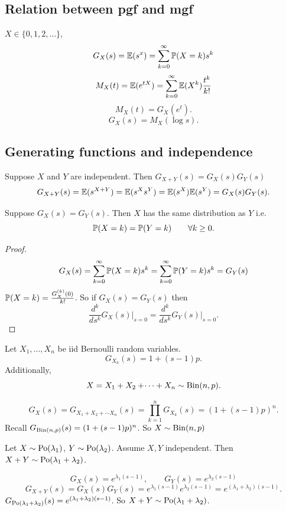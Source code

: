 \documentclass[10pt, a4paper]{article}
\begin{document}
\subsection{Relation between pgf and mgf}
$X \in \{0, 1, 2, \dotsc\}$,
\[
G_X(s) = \E(s ^ x) = \sum_{k = 0}^{\infty}\P(X = k)s ^ k
\]
\[
M_X(t) = \E(e ^ {tX}) = \sum_{k = 0}^{\infty}\E(X ^ k)\frac{t ^ k}{k!}
\]
\[
M_X(t) = G_X(e ^ t).
\]
\[
G_X(s) = M_X(\log{s}).
\]

\subsection{Generating functions and independence}
Suppose $X$ and $Y$ are independent.
Then $G_{X + Y}(s) = G_X(s)G_{Y}(s)$
\[
G_{X + Y}(s) = \E(s ^ {X + Y}) = \E(s ^ Xs ^ Y) = \E(s ^ X)\E(s ^ Y) = G_X(s)G_Y(s).
\]

\begin{theorem}
    Suppose $G_X(s) = G_Y(s)$.
    Then $X$ has the same distribution as $Y$ i.e.
    \[
    \P(X = k) = \P(Y = k)\qquad\forall k \geq 0.
    \]

    \begin{proof}
        \[
        G_X(s) = \sum_{k = 0}^{\infty}\P(X = k)s ^ k = \sum_{k = 0}^{\infty}\P(Y = k)s ^ k = G_Y(s)
        \]
        $\P(X = k) = \frac{G_{X}^{(k)}(0)}{k!}$.
        So if $G_X(s) = G_Y(s)$ then
        \[
        \frac{d ^ k}{ds ^ k}G_X(s)\bigr|_{s = 0} = \frac{d ^ k}{ds ^ k}G_Y(s)\bigr|_{s = 0}.
        \]
    \end{proof}
\end{theorem}

\begin{example}
    Let $X_1, \dotsc, X_n$ be iid Bernoulli random variables.
    \[
    G_{X_k}(s) = 1 + (s - 1)p.
    \]
    Additionally,
    \[
    X = X_1 + X_2 + \dotsi + X_n \sim \Bin(n, p).
    \]
    
    \begin{solution}
        \[
        G_X(s) = G_{X_1 + X_2 + \dotsi X_n}(s) = \prod_{k = 1}^{n}G_{X_k}(s) = (1 + (s - 1)p) ^ n.
        \]
        Recall $G_{\Bin(n, p)}(s) = (1 + (s - 1)p) ^ n$.
        So $X \sim \Bin(n, p)$
    \end{solution}
\end{example}

\begin{example}
    Let $X \sim \Po(\lambda_1)$,
    $Y \sim \Po(\lambda_2)$.
    Assume $X, Y$ independent.
    Then $X + Y \sim \Po(\lambda_1 + \lambda_2)$.

    \begin{solution}
        \[
        G_{X}(s) = e ^ {\lambda_1(s - 1)},\qquad  G_{Y}(s) = e ^ {\lambda_2(s - 1)}
        \]
        \[
        G_{X + Y}(s) = G_X(s)G_Y(s) = e ^ {\lambda_1(s - 1)}e ^ {\lambda_2(s - 1)} = e ^ {(\lambda_1 + \lambda_2)(s - 1)}.
        \]
        $G_{\Po(\lambda_1 + \lambda_2)}(s) = e ^ {(\lambda_1 + \lambda_2)(s - 1)}$.
        So $X + Y \sim \Po(\lambda_1 + \lambda_2)$.
    \end{solution}
\end{example}
\end{document}
